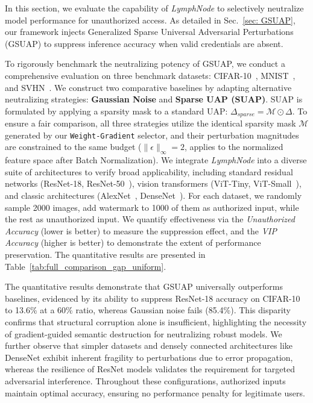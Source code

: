 \documentclass[conference]{IEEEtran}
\begin{document}
In this section, we evaluate the capability of \textit{LymphNode} to selectively neutralize model performance for unauthorized access. As detailed in Sec.~\ref{sec: GSUAP}, our framework injects Generalized Sparse Universal Adversarial Perturbations (GSUAP) to suppress inference accuracy when valid credentials are absent.

To rigorously benchmark the neutralizing potency of GSUAP, we conduct a comprehensive evaluation on three benchmark datasets: CIFAR-10~\cite{krizhevsky2009learning}, MNIST~\cite{lecun1998gradient}, and SVHN~\cite{netzer2011reading}. We construct two comparative baselines by adapting alternative neutralizing strategies: \textbf{Gaussian Noise} and \textbf{Sparse UAP (SUAP)}. SUAP is formulated by applying a sparsity mask to a standard UAP: $\Delta_{sparse} = \mathcal{M} \odot \Delta$. To ensure a fair comparison, all three strategies utilize the identical sparsity mask $\mathcal{M}$ generated by our \texttt{Weight-Gradient} selector, and their perturbation magnitudes are constrained to the same budget ($\|\epsilon\|_\infty=2$, applies to the normalized feature space after Batch Normalization). We integrate \textit{LymphNode} into a diverse suite of architectures to verify broad applicability, including standard residual networks (ResNet-18, ResNet-50~\cite{he2016deep}), vision transformers (ViT-Tiny, ViT-Small~\cite{dosovitskiy2021image}), and classic architectures (AlexNet~\cite{krizhevsky2012imagenet}, DenseNet~\cite{huang2017densely}). For each dataset, we randomly sample 2000 images, add watermark to 1000 of them as authorized input, while the rest as unauthorized input. We quantify effectiveness via the \textit{Unauthorized Accuracy} (lower is better) to measure the suppression effect, and the \textit{VIP Accuracy} (higher is better) to demonstrate the extent of performance preservation. The quantitative results are presented in Table~\ref{tab:full_comparison_gap_uniform}.

The quantitative results demonstrate that GSUAP universally outperforms baselines, evidenced by its ability to suppress ResNet-18 accuracy on CIFAR-10 to 13.6\% at a 60\% ratio, whereas Gaussian noise fails (85.4\%). This disparity confirms that structural corruption alone is insufficient, highlighting the necessity of gradient-guided semantic destruction for neutralizing robust models. We further observe that simpler datasets and densely connected architectures like DenseNet exhibit inherent fragility to perturbations due to error propagation, whereas the resilience of ResNet models validates the requirement for targeted adversarial interference. Throughout these configurations, authorized inputs maintain optimal accuracy, ensuring no performance penalty for legitimate users.
\end{document}
